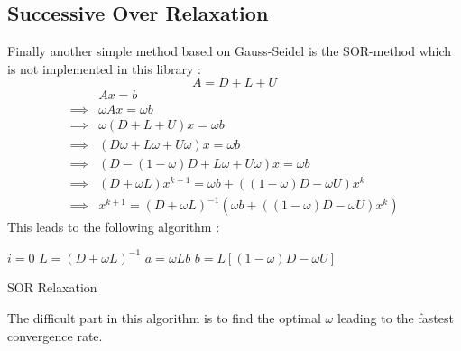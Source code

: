 \documentclass[a4paper]{report}
\begin{document}
\subsection{Successive Over Relaxation}
Finally another simple method based on Gauss-Seidel is the SOR-method which is not implemented in this library :
\[
A=D+L+U
\]
\begin{align*}
&Ax=b \\
\implies & \omega Ax=\omega b \\
\implies & \omega \left( D+L+U \right) x=\omega b\\
\implies & \left( D \omega +L \omega + U \omega \right)x = \omega b\\
\implies & \left( D-(1- \omega)D +L\omega +U\omega \right)x =\omega b\\
\implies & \left( D+ \omega L \right) x^{k+1}=\omega b + \left( (1-\omega)D-\omega U \right)x^k\\
\implies & x^{k+1}=\left( D+ \omega L \right)^{-1} \left( \omega b + \left( (1-\omega)D-\omega U \right)x^k \right)
\end{align*}
This leads to the following algorithm :
\\
\begin{algorithm}[H]
 $i=0$\;
 $L=(D+\omega L)^{-1}$\;
 $a=\omega Lb$\;
 $b=L\left[ (1-\omega)D-\omega U  \right]$\;
 \caption{SOR Relaxation}
\end{algorithm}
The difficult part in this algorithm is to find the optimal $\omega$ leading to the fastest convergence rate.
\end{document}
